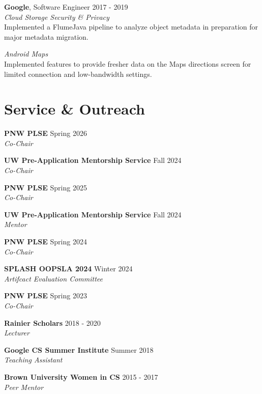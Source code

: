 \documentclass[margin, 10pt]{res} %
\begin{document}
\begin{resume}
{\textbf{Google}, Software Engineer} \hfill 2017 - 2019 \\
\textit{Cloud Storage Security \& Privacy} \\
Implemented a FlumeJava pipeline to analyze object metadata in preparation for major metadata migration. \par
\textit{Android Maps} \\
Implemented features to provide fresher data on the Maps directions screen for limited connection and low-bandwidth settings. \par


\section{Service \& Outreach}
{\textbf{PNW PLSE }} \hfill Spring 2026\\ 
\textit{Co-Chair}

{\textbf{UW Pre-Application Mentorship Service}} \hfill Fall 2024\\ 
\textit{Co-Chair}

{\textbf{PNW PLSE }} \hfill Spring 2025\\ 
\textit{Co-Chair}

{\textbf{UW Pre-Application Mentorship Service}} \hfill Fall 2024\\ 
\textit{Mentor}

{\textbf{PNW PLSE }} \hfill Spring 2024\\ 
\textit{Co-Chair}

{\textbf{SPLASH OOPSLA 2024}} \hfill Winter 2024 \\
\textit{Artifcact Evaluation Committee}

{\textbf{PNW PLSE}} \hfill Spring 2023 \\
\textit{Co-Chair}

{\textbf{Rainier Scholars}} \hfill 2018 - 2020 \\
\textit{Lecturer}

{\textbf{Google CS Summer Institute}} \hfill Summer 2018 \\
\textit{Teaching Assistant}

{\textbf{Brown University Women in CS}} \hfill 2015 - 2017 \\
\textit{Peer Mentor}


\end{resume}
\end{document}
